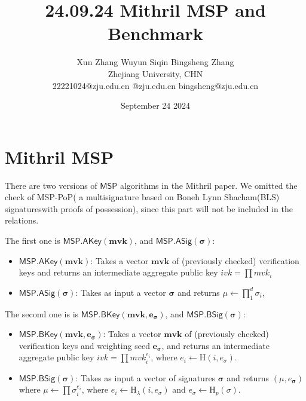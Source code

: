 \documentclass{article}
\title{24.09.24 Mithril MSP and Benchmark}
\author{Xun Zhang \quad \quad Wuyun Siqin \quad \quad Bingsheng Zhang \\ 
Zhejiang University, CHN \\
22221024@zju.edu.cn \quad 3210101763@zju.edu.cn \quad bingsheng@zju.edu.cn}
\date{September 24 2024}
\begin{document}
\maketitle

\section{Mithril MSP}

There are two versions of $\mathsf{MSP}$ algorithms in the Mithril paper.
We omitted the check of MSP-PoP( a multisignature based on Boneh Lynn Shacham(BLS) signatureswith proofs of possession), since this part will not be included in the relations.


The first one is $\mathsf{MSP.AKey}(\textbf{mvk})$, and $\mathsf{MSP.ASig}(\bm{\sigma})$:


\begin{itemize}
    \item $\mathsf{MSP.AKey}(\textbf{mvk})$: Takes a vector $\textbf{mvk}$ of (previously checked) verification keys and returns an intermediate aggregate public key
    $ivk=\prod mvk_i$
    \item  $\mathsf{MSP.ASig}(\bm{\sigma})$: Takes as input a vector $\bm{\sigma}$ and returns $\mu \leftarrow \prod_{1}^d \sigma_i$,
\end{itemize}

The second one is is $\mathsf{MSP.BKey}(\textbf{mvk}, \bm{e_\sigma})$, and $\mathsf{MSP.BSig}(\bm{\sigma})$:


\begin{itemize}
    \item $\mathsf{MSP.BKey}(\textbf{mvk}, \bm{e_\sigma})$: Takes a vector $\textbf{mvk}$ of (previously checked) verification keys and weighting seed $\bm{e_\sigma}$, and returns an intermediate aggregate public key 
$ivk=\prod mvk_i^{e_i} $, where $e_i \leftarrow \textrm{H}(i,e_\sigma)$.
    \item $\mathsf{MSP.BSig}(\bm{\sigma})$: Takes as input a vector of signatures $\bm{\sigma}$ and returns $(\mu,e_{\bm{\sigma}})$ where
$\mu \leftarrow \prod \sigma_i^{e_i}$, where $e_i \leftarrow \textrm{H}_{\lambda}(i,e_\sigma)$ and $e_\sigma \leftarrow \textrm{H}_{p}(\mathbb{\sigma})$.
\end{itemize}
\end{document}
